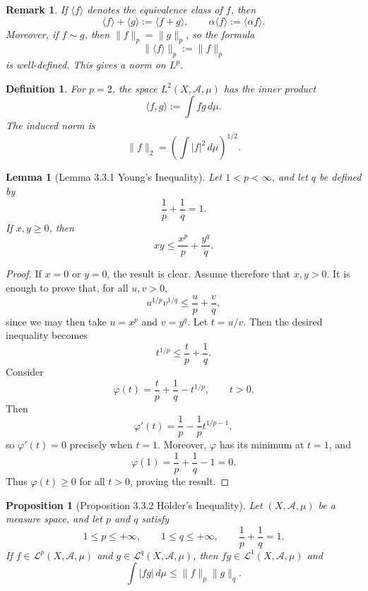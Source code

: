 \documentclass[12pt]{article}
\newtheorem{lemma}{Lemma}
\newtheorem{definition}{Definition}
\newtheorem{proposition}{Proposition}
\newtheorem{remark}{Remark}
\begin{document}
\begin{remark}
If $\langle f\rangle$ denotes the equivalence class of $f$, then
\[
\langle f\rangle+\langle g\rangle:=\langle f+g\rangle,
\qquad
\alpha\langle f\rangle:=\langle \alpha f\rangle.
\]
Moreover, if $f\sim g$, then $\|f\|_p=\|g\|_p$, so the formula
\[
\|\langle f\rangle\|_p:=\|f\|_p
\]
is well-defined. This gives a norm on $L^p$.
\end{remark}

\begin{definition}
For $p=2$, the space $L^2(X,\mathcal{A},\mu)$ has the inner product
\[
\langle f,g\rangle
:=
\int fg\,d\mu.
\]
The induced norm is
\[
\|f\|_2
=
\left(\int |f|^2\,d\mu\right)^{1/2}.
\]
\end{definition}

\begin{lemma}[Lemma 3.3.1 Young's Inequality]
Let $1<p<\infty$, and let $q$ be defined by
\[
\frac1p+\frac1q=1.
\]
If $x,y\ge 0$, then
\[
xy \le \frac{x^p}{p}+\frac{y^q}{q}.
\]
\end{lemma}

\begin{proof}
If $x=0$ or $y=0$, the result is clear. Assume therefore that $x,y>0$.
It is enough to prove that, for all $u,v>0$,
\[
u^{1/p}v^{1/q}\le \frac{u}{p}+\frac{v}{q},
\]
since we may then take $u=x^p$ and $v=y^q$. Let $t=u/v$. Then the desired inequality becomes
\[
t^{1/p}\le \frac{t}{p}+\frac1q.
\]
Consider
\[
\varphi(t)=\frac{t}{p}+\frac1q-t^{1/p},
\qquad t>0.
\]
Then
\[
\varphi'(t)=\frac1p-\frac1p t^{1/p-1},
\]
so $\varphi'(t)=0$ precisely when $t=1$. Moreover, $\varphi$ has its minimum at
$t=1$, and
\[
\varphi(1)=\frac1p+\frac1q-1=0.
\]
Thus $\varphi(t)\ge 0$ for all $t>0$, proving the result.
\end{proof}

\begin{proposition}[Proposition 3.3.2 Hölder's Inequality]
Let $(X,\mathcal{A},\mu)$ be a measure space, and let $p$ and $q$ satisfy
\[
1\le p\le +\infty,\qquad 1\le q\le +\infty,
\qquad \frac1p+\frac1q=1.
\]
If $f\in \mathcal{L}^p(X,\mathcal{A},\mu)$ and
$g\in \mathcal{L}^q(X,\mathcal{A},\mu)$, then
$fg\in \mathcal{L}^1(X,\mathcal{A},\mu)$ and
\[
\int |fg|\,d\mu \le \|f\|_p\|g\|_q.
\]
\end{proposition}
\end{document}
